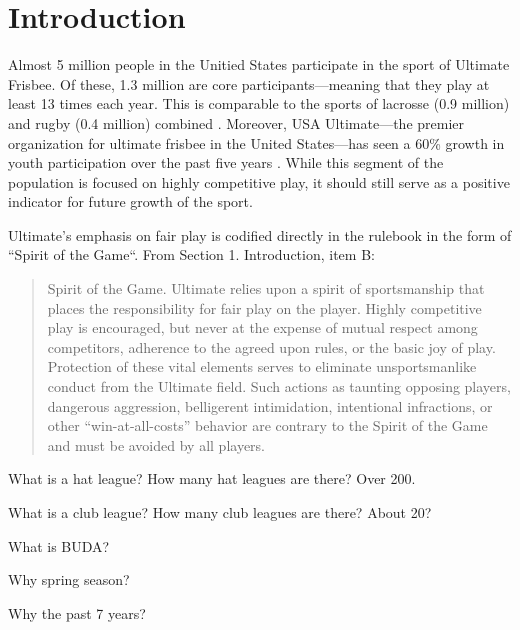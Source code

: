 \section{Introduction}

Almost 5 million people in the Unitied States participate in the sport of Ultimate Frisbee.  Of these, 1.3 million are core participants---meaning that they play at least 13 times each year.  This is comparable to the sports of lacrosse (0.9 million) and rugby (0.4 million) combined \cite{sfia_2016}. Moreover, USA Ultimate---the premier organization for ultimate frisbee in the United States---has seen a 60\% growth in youth participation over the past five years \cite{usau_2016}.  While this segment of the population is focused on highly competitive play, it should still serve as a positive indicator for future growth of the sport.

Ultimate's emphasis on fair play is codified directly in the rulebook in the form of ``Spirit of the Game``.  From Section 1. Introduction, item B:

\begin{quote} Spirit of the Game. Ultimate relies upon a spirit of sportsmanship that places the responsibility for fair play on the player. Highly competitive play is encouraged, but never at the expense of mutual respect among competitors, adherence to the agreed upon rules, or the basic joy of play. Protection of these vital elements serves to eliminate unsportsmanlike conduct from the Ultimate field. Such actions as taunting opposing players, dangerous aggression, belligerent intimidation, intentional infractions, or other ``win-at-all-costs'' behavior are contrary to the Spirit of the Game and must be avoided by all players.
\end{quote}

What is a hat league?  How many hat leagues are there? Over 200.

What is a club league?  How many club leagues are there? About 20?

What is BUDA?

Why spring season?

Why the past 7 years?
